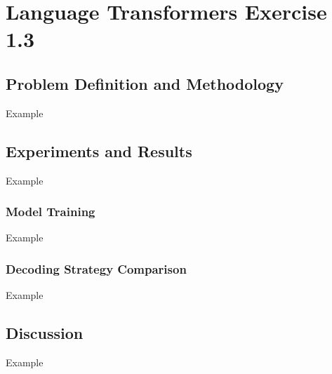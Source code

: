 \clearpage
\section{Language Transformers Exercise 1.3}
\label{sec:exercise3}
\subsection{Problem Definition and Methodology}
Example

\subsection{Experiments and Results}
Example

\subsubsection{Model Training}
Example

\subsubsection{Decoding Strategy Comparison}
Example

\subsection{Discussion}
Example